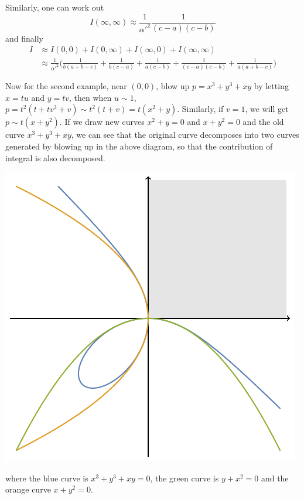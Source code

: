 \documentclass[12pt]{article}
\theoremstyle{definition}
\theoremstyle{plain}
\begin{document}
Similarly, one can work out 
\[
	I(\infty,\infty)\approx \frac{1}{{\alpha'}^2}\frac{1}{(c-a) (c-b)} 
\]
and finally
\begin{align*}
	I&\approx I(0,0)+I(0,\infty)+I(\infty,0)+I(\infty,\infty)\\
	 &\approx \frac{1}{{\alpha'}^2}
	 \biggl(
\frac{1}{b (a+b-c)}+\frac{1}{b (c-a)}+\frac{1}{a (c-b)}+\frac{1}{(c-a) (c-b)}+\frac{1}{a (a+b-c)}
	 \biggr)
\end{align*}

Now for the second example, near $(0,0)$, blow up $p=x^3+y^3+x y$ by letting
$x=tu$ and $y=tv$, then when $u\sim 1$, 
$p=t^2(t +t v^3+ v)\sim t^2(t+v)=t(x^2+y)$. 
Similarly, if $v=1$, we will get $p\sim t(x+y^2)$. 
If we draw new curves $x^2+y=0$ and $x+y^2=0$ and the old curve $x^3+y^3+xy$, 
we can see that the original curve
decomposes into two curves generated by blowing up in the above diagram, so that 
the contribution of integral is also decomposed.
\begin{center}
	\includegraphics[scale=0.7]{fig_2.pdf}	
\end{center}
where the blue curve is $x^3+y^3+xy=0$, the green curve is $y+x^2=0$ and
the orange curve $x+y^2=0$.
\end{document}

